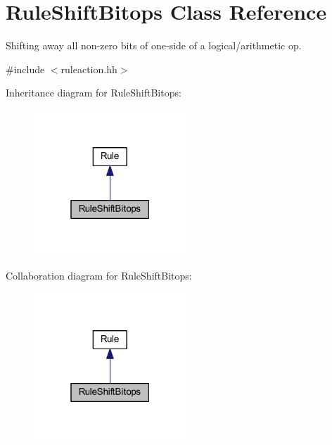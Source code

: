 \hypertarget{class_rule_shift_bitops}{}\section{Rule\+Shift\+Bitops Class Reference}
\label{class_rule_shift_bitops}


Shifting away all non-\/zero bits of one-\/side of a logical/arithmetic op.  




{\ttfamily \#include $<$ruleaction.\+hh$>$}



Inheritance diagram for Rule\+Shift\+Bitops\+:
\nopagebreak
\begin{figure}[H]
\begin{center}
\leavevmode
\includegraphics[width=163pt]{class_rule_shift_bitops__inherit__graph}
\end{center}
\end{figure}


Collaboration diagram for Rule\+Shift\+Bitops\+:
\nopagebreak
\begin{figure}[H]
\begin{center}
\leavevmode
\includegraphics[width=163pt]{class_rule_shift_bitops__coll__graph}
\end{center}
\end{figure}
